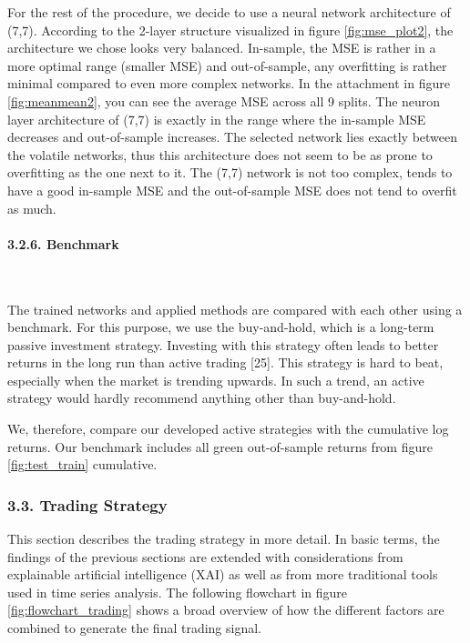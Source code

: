 \documentclass[
]{article}
\begin{document}
For the rest of the procedure, we decide to use a neural network
architecture of (7,7). According to the 2-layer structure visualized in
figure \ref{fig:mse_plot2}, the architecture we chose looks very
balanced. In-sample, the MSE is rather in a more optimal range (smaller
MSE) and out-of-sample, any overfitting is rather minimal compared to
even more complex networks. In the attachment in figure
\ref{fig:meanmean2}, you can see the average MSE across all 9 splits.
The neuron layer architecture of (7,7) is exactly in the range where the
in-sample MSE decreases and out-of-sample increases. The selected
network lies exactly between the volatile networks, thus this
architecture does not seem to be as prone to overfitting as the one next
to it. The (7,7) network is not too complex, tends to have a good
in-sample MSE and the out-of-sample MSE does not tend to overfit as
much.

\hypertarget{benchmark}{%
\paragraph{3.2.6. Benchmark}\label{benchmark}}

~

The trained networks and applied methods are compared with each other
using a benchmark. For this purpose, we use the buy-and-hold, which is a
long-term passive investment strategy. Investing with this strategy
often leads to better returns in the long run than active trading
{[}25{]}. This strategy is hard to beat, especially when the market is
trending upwards. In such a trend, an active strategy would hardly
recommend anything other than buy-and-hold.

We, therefore, compare our developed active strategies with the
cumulative log returns. Our benchmark includes all green out-of-sample
returns from figure \ref{fig:test_train} cumulative.

\newpage

\hypertarget{trading-strat}{%
\subsubsection{3.3. Trading Strategy}\label{trading-strat}}

This section describes the trading strategy in more detail. In basic
terms, the findings of the previous sections are extended with
considerations from explainable artificial intelligence (XAI) as well as
from more traditional tools used in time series analysis. The following
flowchart in figure \ref{fig:flowchart_trading} shows a broad overview
of how the different factors are combined to generate the final trading
signal.
\end{document}
